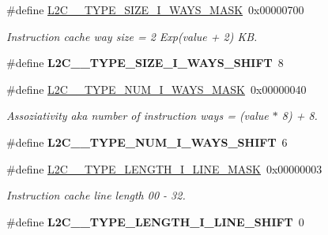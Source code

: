 \begin{DoxyCompactItemize}
\#define \mbox{\hyperlink{group__L2C-310__cache_gaf07d47ae4165a97e148db412d8e34444}{L2\+C\+\_\+\_\+\+T\+Y\+P\+E\+\_\+\+S\+I\+Z\+E\+\_\+\+I\+\_\+\+W\+A\+Y\+S\+\_\+\+M\+A\+SK}}~0x00000700
\begin{DoxyCompactList}\small\item\em Instruction cache way size = 2 Exp(value + 2) KB. \end{DoxyCompactList}\item 
\mbox{\label{group__L2C-310__cache_gaa5f73ed47979317a588160482f9099d5}} 
\#define {\bfseries L2\+C\+\_\+\_\+\+T\+Y\+P\+E\+\_\+\+S\+I\+Z\+E\+\_\+\+I\+\_\+\+W\+A\+Y\+S\+\_\+\+S\+H\+I\+FT}~8
\item 
\mbox{\label{group__L2C-310__cache_ga5fa485a1b665a73e33caa292db1ff6c0}} 
\#define \mbox{\hyperlink{group__L2C-310__cache_ga5fa485a1b665a73e33caa292db1ff6c0}{L2\+C\+\_\+\_\+\+T\+Y\+P\+E\+\_\+\+N\+U\+M\+\_\+\+I\+\_\+\+W\+A\+Y\+S\+\_\+\+M\+A\+SK}}~0x00000040
\begin{DoxyCompactList}\small\item\em Assoziativity aka number of instruction ways = (value $\ast$ 8) + 8. \end{DoxyCompactList}\item 
\mbox{\label{group__L2C-310__cache_ga5e734c36c1d9196ca508e5a7aa5cc70f}} 
\#define {\bfseries L2\+C\+\_\+\_\+\+T\+Y\+P\+E\+\_\+\+N\+U\+M\+\_\+\+I\+\_\+\+W\+A\+Y\+S\+\_\+\+S\+H\+I\+FT}~6
\item 
\mbox{\label{group__L2C-310__cache_gab07abc75d72cf42d92bdb0886a7aebae}} 
\#define \mbox{\hyperlink{group__L2C-310__cache_gab07abc75d72cf42d92bdb0886a7aebae}{L2\+C\+\_\+\_\+\+T\+Y\+P\+E\+\_\+\+L\+E\+N\+G\+T\+H\+\_\+\+I\+\_\+\+L\+I\+N\+E\+\_\+\+M\+A\+SK}}~0x00000003
\begin{DoxyCompactList}\small\item\em Instruction cache line length 00 -\/ 32. \end{DoxyCompactList}\item 
\mbox{\label{group__L2C-310__cache_gaad56ad82579ec4f5241f9fc3239f968f}} 
\#define {\bfseries L2\+C\+\_\+\_\+\+T\+Y\+P\+E\+\_\+\+L\+E\+N\+G\+T\+H\+\_\+\+I\+\_\+\+L\+I\+N\+E\+\_\+\+S\+H\+I\+FT}~0
\item 

\end{DoxyCompactItemize}
